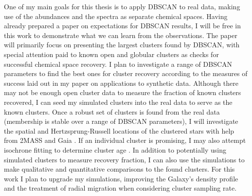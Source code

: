 \documentclass[11pt]{article}
\begin{document}
One of my main goals for this thesis is to apply DBSCAN to real data, making use of the abundances and the spectra as separate chemical spaces. Having already prepared a paper on expectations for DBSCAN results, I will be free in this work to demonstrate what we can learn from the observations. The paper will primarily focus on presenting the largest clusters found by DBSCAN, with special attention paid to known open and globular clusters as checks for successful chemical space recovery. I plan to investigate a range of DBSCAN parameters to find the best ones for cluster recovery according to the measures of success laid out in my paper on applications to synthetic data. Although there may not be enough open cluster data to measure the fraction of known clusters recovered, I can seed my simulated clusters into the real data to serve as the known clusters. Once a robust set of clusters is found from the real data (membership is stable over a range of DBSCAN parameters), I will investigate the spatial and Hertzsprung-Russell locations of the clustered stars with help from 2MASS \citep{Skrutskie} and Gaia \citep{GaiaCollaboration}. If an individual cluster is promising, I may also attempt isochrone fitting to determine cluster age \citep{parsec}. In addition to potentially using simulated clusters to measure recovery fraction, I can also use the simulations to make qualitative and quantitative comparisons to the found clusters. For this work I plan to upgrade my simulations, improving the Galaxy's density profile and the treatment of radial migration when considering cluster sampling rate.
\end{document}
